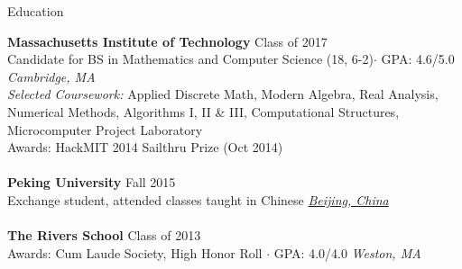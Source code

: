 \documentclass{resume} %
\begin{document}

\begin{rSection}{Education}

{\bf Massachusetts Institute of Technology} \hfill Class of 2017
\\ Candidate for BS in Mathematics and Computer Science (18, 6-2)$\cdot$ GPA: 4.6/5.0 \hfill {\em Cambridge, MA}
\\ {\em Selected Coursework:} 
Applied Discrete Math, Modern Algebra, Real Analysis, Numerical Methods,
Algorithms I, II \& III, Computational Structures, Microcomputer Project Laboratory
\\ Awards: HackMIT 2014 Sailthru Prize (Oct 2014)
\\
\\ {\bf Peking University} \hfill Fall 2015
\\ Exchange student, attended classes taught in Chinese  \hfill \underline{\em Beijing, China}
\\
\\ {\bf The Rivers School} \hfill  Class of 2013
\\ Awards: Cum Laude Society, High Honor Roll $\cdot$ GPA: 4.0/4.0 \hfill {\em Weston, MA}

\end{rSection}

\end{document}

